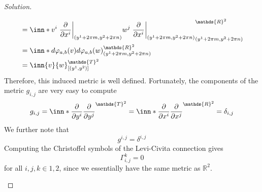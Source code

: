 \documentclass[a4paper]{article}
\begin{document}
\begin{proof}[Solution]
\begin{enumerate}[(a)]
\[\begin{aligned}
                                                   &= \inn*{ v^i \eval{\pdv{x^i}}_{(y^1 + 2\pi m, y^2 + 2\pi n)}}{w^j \eval{\pdv{x^i}}_{(y^1 + 2\pi m, y^2 + 2\pi n)}}_{(y^1 + 2\pi m, y^2 + 2\pi n)}^{\mathds{R}^2}  \\
                                                   &= \inn*{d\varphi_{a,b}(v)}{d\varphi_{a,b}(w)}_{(y^1 + 2\pi m, y^2 + 2\pi n)}^{\mathds{R}^2} \\
                                                   &= \inn{v}{w}^{\mathds{T}^2}_{[(y^1, y^2)]}
        \end{aligned}
      \]
      Therefore, this induced metric is well defined. Fortunately, the components of the metric $g_{i,j}$ are very easy to compute
      \[
        g_{i,j} = \inn*{\pdv{y^i}}{\pdv{y^j}}^{\mathds{T}^2} = \inn*{\pdv{x^i}}{\pdv{x^j}}^{\mathds{R}^2} = \delta_{i,j}
      \]
      We further note that
      \[
        g^{i,j} = \delta^{i,j}
      \]
      Computing the Christoffel symbols of the Levi-Civita connection gives
      \[
        \Gamma^{k}_{i,j} = 0
      \]
      for all $i,j,k \in {1,2}$, since we essentially have the same metric as $\mathds{R}^2$.


\end{enumerate}
\end{proof}
\end{document}

